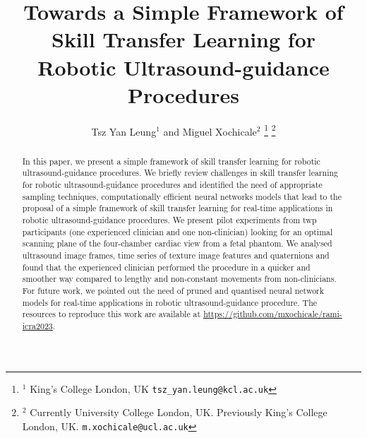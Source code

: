 \documentclass[a4paper, 10pt, conference]{ieeeconf}      %
\title{\LARGE \bf
Towards a Simple Framework of Skill Transfer Learning for \\ Robotic Ultrasound-guidance Procedures %
}
\author{Tsz Yan Leung$^{1}$ and Miguel Xochicale$^{2}$%
\thanks{$^{1}$
	King's College London, UK
       {\tt\small tsz\_yan.leung@kcl.ac.uk}}%
\thanks{$^{2}$
	Currently University College London, UK. 
        Previously King's College London, UK.
        {\tt\small m.xochicale@ucl.ac.uk}}%
}
\begin{document}
\maketitle
\thispagestyle{empty}
\pagestyle{empty}


\begin{abstract}
In this paper, we present a simple framework of skill transfer learning for robotic ultrasound-guidance procedures.
We briefly review challenges in skill transfer learning for robotic ultrasound-guidance procedures and identified the need of appropriate sampling techniques, computationally efficient neural networks models that lead to the proposal of a simple framework of skill transfer learning for real-time applications in robotic ultrasound-guidance procedures.
We present pilot experiments from twp participants (one experienced clinician and one non-clinician) looking for an optimal scanning plane of the four-chamber cardiac view from a fetal phantom.
We analysed ultrasound image frames, time series of texture image features and quaternions and found that the experienced clinician performed the procedure in a quicker and smoother way compared to lengthy and non-constant movements from non-clinicians.
For future work, we pointed out
the need of pruned and quantised neural network models
for real-time applications in robotic ultrasound-guidance
procedure.
The resources to reproduce this work are available at \url{https://github.com/mxochicale/rami-icra2023}.
\end{abstract}



\end{document}
